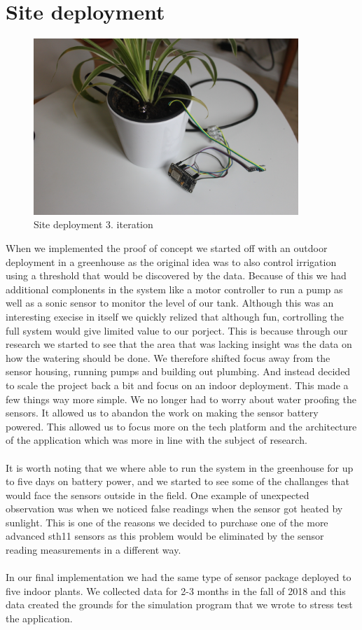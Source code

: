 \documentclass[]{uiophd}
\begin{document}
\section{Site deployment}
 \begin{figure}[h]
\caption{Site deployment 3. iteration}
\centering
\includegraphics[width=10cm]{mcu+sensor.jpg}
\end{figure}

When we implemented the proof of concept we started off with an outdoor deployment in a greenhouse as the original idea was to also control irrigation using a threshold that would be discovered by the data. Because of this we had additional complonents in the system like a motor controller to run a pump as well as a sonic sensor to monitor the level of our tank. Although this was an interesting execise in itself we quickly relized that although fun, cortrolling the full system would give limited value to our porject. This is because through our research we started to see that the area that was lacking insight was the data on how the watering should be done. We therefore shifted focus away from the sensor housing, running pumps and building out plumbing. And instead decided to scale the project back a bit and focus on an indoor deployment. This made a few things way more simple. We no longer had to worry about water proofing the sensors. It allowed us to abandon the work on making the sensor battery powered. This allowed us to focus more on the tech platform and the architecture of the application which was more in line with the subject of research. 
\\\\
It is worth noting that we where able to run the system in the greenhouse for up to five days on battery power, and we started to see some of the challanges that would face the sensors outside in the field. One example of unexpected observation was when we noticed false readings when the sensor got heated by sunlight. This is one of the reasons we decided to purchase one of the more advanced sth11 sensors as this problem would be eliminated by the sensor reading measurements in a different way.
\\\\
In our final implementation we had the same type of sensor package deployed to five indoor plants. We collected data for 2-3 months in the fall of 2018 and this data created the grounds for the simulation program that we wrote to stress test the application.
\end{document}
